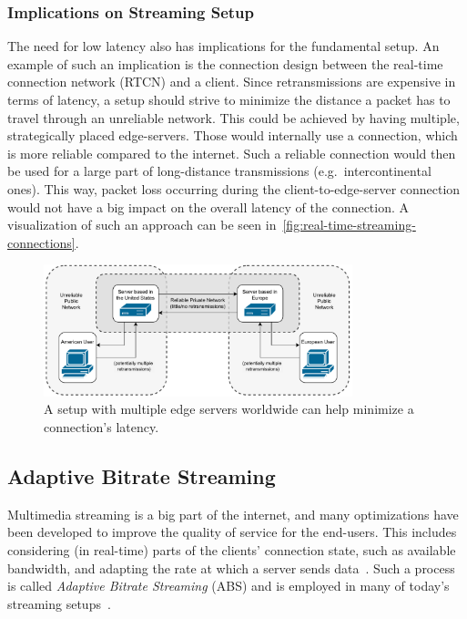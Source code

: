 \subsubsection{Implications on Streaming Setup}
The need for low latency also has implications for the fundamental setup.
An example of such an implication is the connection design between the 
real-time connection network (RTCN) and a client.
Since retransmissions are expensive in terms of latency, a setup should strive to minimize 
the distance a packet has to travel through an unreliable network.
This could be achieved by having multiple, strategically placed edge-servers.
Those would internally use a connection, which is more reliable compared to the internet.
Such a reliable connection would then be used for a large part of long-distance transmissions
(e.g.~intercontinental ones).
This way, packet loss occurring during the client-to-edge-server connection would not have a big 
impact on the overall latency of the connection.
A visualization of such an approach can be seen in~\autoref{fig:real-time-streaming-connections}.

\vspace{0.5cm}
\begin{figure}[H]
    \centering
    \includegraphics[width=0.8\textwidth]{figures/02_background/real-time-streaming-connections.drawio.pdf}
    \caption[Real-time streaming connections]{A setup with multiple edge servers worldwide can help minimize a connection's latency.}\label{fig:real-time-streaming-connections}
\end{figure}

\subsection{Adaptive Bitrate Streaming}\label{subsec:adaptive_bitrate_streaming}
Multimedia streaming is a big part of the internet, and many optimizations have
been developed to improve the quality of service for the end-users.
This includes considering (in real-time) parts of the clients' connection state, 
such as available bandwidth, and adapting the rate at which a server sends 
data~\parencite{cloudflare-what-is-adaptive-bitrate-streaming,imagekit-adaptive-bitrate-streaming}.
Such a process is called \textit{Adaptive Bitrate Streaming} (ABS) and is employed in many 
of today's streaming setups~\parencite{netflix-optimizing-stream-experience}.

